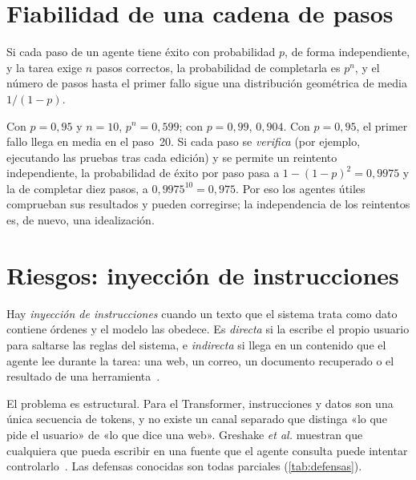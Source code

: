 \section{Fiabilidad de una cadena de pasos}

\begin{proposicion}\label{prop:fiabilidad}
Si cada paso de un agente tiene éxito con probabilidad $p$, de forma independiente, y la tarea exige $n$ pasos correctos, la probabilidad de completarla es $p^{n}$, y el número de pasos hasta el primer fallo sigue una distribución geométrica de media $1/(1-p)$.
\end{proposicion}

Con $p=0{,}95$ y $n=10$, $p^{n}=0{,}599$; con $p=0{,}99$, $0{,}904$. Con $p=0{,}95$, el primer fallo llega en media en el paso~20. Si cada paso se \emph{verifica} (por ejemplo, ejecutando las pruebas tras cada edición) y se permite un reintento independiente, la probabilidad de éxito por paso pasa a $1-(1-p)^{2}=0{,}9975$ y la de completar diez pasos, a $0{,}9975^{10}=0{,}975$. Por eso los agentes útiles comprueban sus resultados y pueden corregirse; la independencia de los reintentos es, de nuevo, una idealización.

\section{Riesgos: inyección de instrucciones}

\begin{definicion}\label{def:inyeccion}
Hay \emph{inyección de instrucciones} cuando un texto que el sistema trata como dato contiene órdenes y el modelo las obedece. Es \emph{directa} si la escribe el propio usuario para saltarse las reglas del sistema, e \emph{indirecta} si llega en un contenido que el agente lee durante la tarea: una web, un correo, un documento recuperado o el resultado de una herramienta~\cite{greshake}.
\end{definicion}

El problema es estructural. Para el Transformer, instrucciones y datos son una única secuencia de tokens, y no existe un canal separado que distinga «lo que pide el usuario» de «lo que dice una web». Greshake \emph{et al.} muestran que cualquiera que pueda escribir en una fuente que el agente consulta puede intentar controlarlo~\cite{greshake}. Las defensas conocidas son todas parciales (\cref{tab:defensas}).

